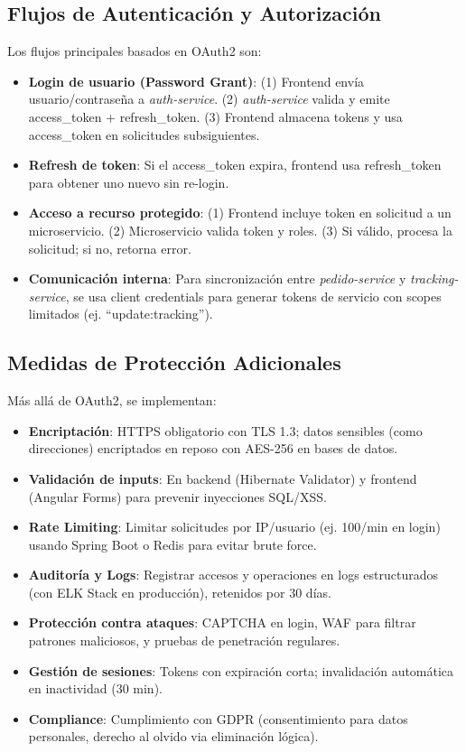 \documentclass[a4paper,12pt]{article}
\begin{document}
\subsection{Flujos de Autenticación y Autorización}
Los flujos principales basados en OAuth2 son:
\begin{itemize}
    \item \textbf{Login de usuario (Password Grant)}: (1) Frontend envía usuario/contraseña a \textit{auth-service}. (2) \textit{auth-service} valida y emite access_token + refresh_token. (3) Frontend almacena tokens y usa access_token en solicitudes subsiguientes.
    \item \textbf{Refresh de token}: Si el access_token expira, frontend usa refresh_token para obtener uno nuevo sin re-login.
    \item \textbf{Acceso a recurso protegido}: (1) Frontend incluye token en solicitud a un microservicio. (2) Microservicio valida token y roles. (3) Si válido, procesa la solicitud; si no, retorna error.
    \item \textbf{Comunicación interna}: Para sincronización entre \textit{pedido-service} y \textit{tracking-service}, se usa client credentials para generar tokens de servicio con scopes limitados (ej. ``update:tracking'').
\end{itemize}

\subsection{Medidas de Protección Adicionales}
Más allá de OAuth2, se implementan:
\begin{itemize}
    \item \textbf{Encriptación}: HTTPS obligatorio con TLS 1.3; datos sensibles (como direcciones) encriptados en reposo con AES-256 en bases de datos.
    \item \textbf{Validación de inputs}: En backend (Hibernate Validator) y frontend (Angular Forms) para prevenir inyecciones SQL/XSS.
    \item \textbf{Rate Limiting}: Limitar solicitudes por IP/usuario (ej. 100/min en login) usando Spring Boot o Redis para evitar brute force.
    \item \textbf{Auditoría y Logs}: Registrar accesos y operaciones en logs estructurados (con ELK Stack en producción), retenidos por 30 días.
    \item \textbf{Protección contra ataques}: CAPTCHA en login, WAF para filtrar patrones maliciosos, y pruebas de penetración regulares.
    \item \textbf{Gestión de sesiones}: Tokens con expiración corta; invalidación automática en inactividad (30 min).
    \item \textbf{Compliance}: Cumplimiento con GDPR (consentimiento para datos personales, derecho al olvido via eliminación lógica).
\end{itemize}
\end{document}
